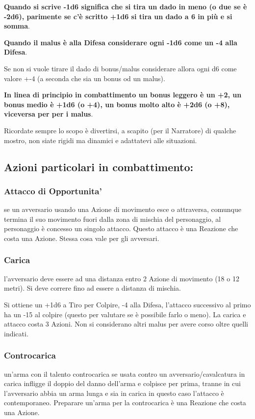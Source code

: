 \documentclass[a4paper,11pt,twoside,openany]{book}
\begin{document}
\textbf{Quando si scrive -1d6 significa che si tira un dado in meno (o due se è -2d6), parimente se c'è scritto +1d6 si tira un dado a 6 in più e si somma}.

\textbf{Quando il malus è alla Difesa considerare ogni -1d6 come un -4 alla Difesa}.

Se non si vuole tirare il dado di bonus/malus considerare allora ogni d6 come valore +-4 (a seconda che sia un bonus od un malus).

\textbf{In linea di principio in combattimento un bonus leggero è un +2, un bonus medio è +1d6 (o +4), un bonus molto alto è +2d6 (o +8), viceversa per per i malus}.

\bigskip
Ricordate sempre lo scopo è divertirsi, a scapito (per il Narratore) di qualche mostro, non siate rigidi ma dinamici e adattatevi alle situazioni.

\subsection{Azioni particolari in combattimento:}

\subsubsection{Attacco di Opportunita'} se un avversario usando una Azione di movimento esce o attraversa, comunque termina il suo movimento fuori dalla zona di mischia del personaggio, al personaggio è concesso un singolo attacco. Questo attacco è una Reazione che costa una Azione. Stessa cosa vale per gli avversari.

\subsubsection{Carica} l'avversario deve essere ad una distanza entro 2 Azione di movimento (18 o 12 metri). Si deve correre fino ad essere a distanza di mischia.

Si ottiene un +1d6 a Tiro per Colpire, -4 alla Difesa, l'attacco successivo al primo ha un -15 al colpire (questo per valutare se è possibile farlo o meno). La carica e attacco costa 3 Azioni. Non si considerano altri malus per avere corso oltre quelli indicati.

\subsubsection{Controcarica} un'arma con il talento controcarica se usata contro un avversario/cavalcatura in carica infligge il doppio del danno dell'arma e colpisce per prima, tranne in cui l'avversario abbia un arma lunga e sia in carica in questo caso l'attacco è contemporaneo. Preparare un'arma per la controcarica è una Reazione che costa una Azione.
\end{document}
